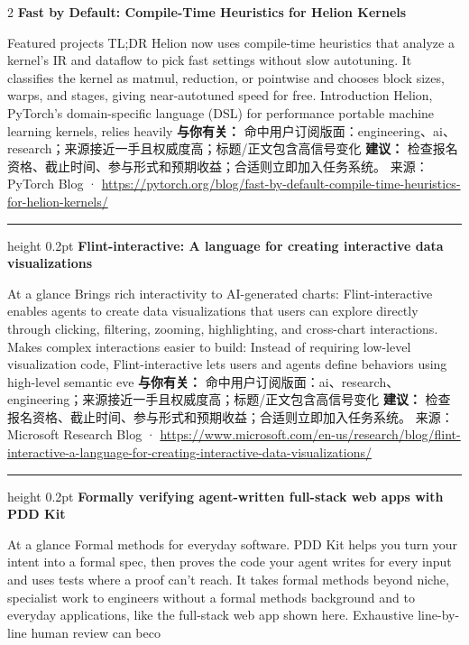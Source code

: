 \documentclass[10.5pt]{ctexart}
\begin{document}
\begin{multicols}{2}
{\large\bfseries Fast by Default: Compile-Time Heuristics for Helion Kernels}\par
Featured projects TL;DR Helion now uses compile-time heuristics that analyze a kernel’s IR and dataflow to pick fast settings without slow autotuning. It classifies the kernel as matmul, reduction, or pointwise and chooses block sizes, warps, and stages, giving near-autotuned speed for free. Introduction Helion, PyTorch’s domain-specific language (DSL) for performance portable machine learning kernels, relies heavily
\textbf{与你有关：} 命中用户订阅版面：engineering、ai、research；来源接近一手且权威度高；标题/正文包含高信号变化
\textbf{建议：} 检查报名资格、截止时间、参与形式和预期收益；合适则立即加入任务系统。
{\footnotesize\color{ormuted} 来源：PyTorch Blog · \url{https://pytorch.org/blog/fast-by-default-compile-time-heuristics-for-helion-kernels/}}
\vspace{2mm}
\hrule height 0.2pt
\vspace{2mm}
{\large\bfseries Flint-interactive: A language for creating interactive data visualizations}\par
At a glance Brings rich interactivity to AI-generated charts: Flint-interactive enables agents to create data visualizations that users can explore directly through clicking, filtering, zooming, highlighting, and cross-chart interactions. Makes complex interactions easier to build: Instead of requiring low-level visualization code, Flint-interactive lets users and agents define behaviors using high-level semantic eve
\textbf{与你有关：} 命中用户订阅版面：ai、research、engineering；来源接近一手且权威度高；标题/正文包含高信号变化
\textbf{建议：} 检查报名资格、截止时间、参与形式和预期收益；合适则立即加入任务系统。
{\footnotesize\color{ormuted} 来源：Microsoft Research Blog · \url{https://www.microsoft.com/en-us/research/blog/flint-interactive-a-language-for-creating-interactive-data-visualizations/}}
\vspace{2mm}
\hrule height 0.2pt
\vspace{2mm}
{\large\bfseries Formally verifying agent-written full-stack web apps with PDD Kit}\par
At a glance Formal methods for everyday software. PDD Kit helps you turn your intent into a formal spec, then proves the code your agent writes for every input and uses tests where a proof can’t reach. It takes formal methods beyond niche, specialist work to engineers without a formal methods background and to everyday applications, like the full-stack web app shown here. Exhaustive line-by-line human review can beco

\end{multicols}
\end{document}
